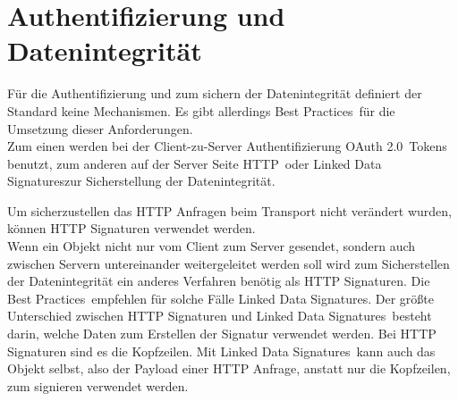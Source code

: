 \section{Authentifizierung und Datenintegrität}
	Für die Authentifizierung und zum sichern der Datenintegrität definiert der Standard keine Mechanismen. Es gibt allerdings \glqq Best Practices\grqq~für die Umsetzung dieser Anforderungen.\\
	
	Zum einen werden bei der Client-zu-Server Authentifizierung \glqq OAuth 2.0\grqq~Tokens benutzt, zum anderen auf der Server Seite \glqq HTTP\grqq~oder \glqq Linked Data Signatures\grqq zur Sicherstellung der Datenintegrität.\\
	
	
	
	Um sicherzustellen das HTTP Anfragen beim Transport nicht verändert wurden, können HTTP Signaturen verwendet werden.\\
	Wenn ein Objekt nicht nur vom Client zum Server gesendet, sondern auch zwischen Servern untereinander weitergeleitet werden soll wird zum Sicherstellen der Datenintegrität ein anderes Verfahren benötig als HTTP Signaturen. Die \glqq Best Practices\grqq~empfehlen für solche Fälle \glqq Linked Data Signatures\grqq. Der größte Unterschied zwischen HTTP Signaturen und \glqq Linked Data Signatures\grqq~besteht darin, welche Daten zum Erstellen der Signatur verwendet werden. Bei HTTP Signaturen sind es die Kopfzeilen. Mit \glqq Linked Data Signatures\grqq~kann auch das Objekt selbst, also der Payload einer HTTP Anfrage, anstatt nur die Kopfzeilen, zum signieren verwendet werden.